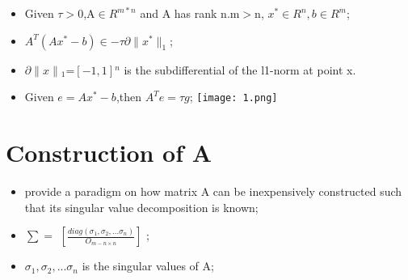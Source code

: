\documentclass{beamer}
\begin{document}
\begin{frame}
	\begin{itemize}
			\item Given $\tau>0$,A$\in R^{m*n}$ and A has rank n.m$>$n, ${x^*}\in{R^n},b \in {R^m}$;
			\item ${A^T} \left( Ax^* -b \right)\in -\tau \partial\|x ^{*}\|_{1}$;
			\item $\partial\|x\|{_1}$=$\left[-1, 1\right]{^n}$  is the subdifferential of the l1-norm at point x.
	\end{itemize}
\end{frame}

\begin{frame}
	\begin{itemize}
			\item Given $e = Ax^* -b$,then $A^T e = \tau g$;
			\texttt{[image: 1.png]} 
	\end{itemize}
\end{frame}

\section{Construction of  A}
\begin{frame}
    \tableofcontents[currentsection]
\end{frame}

\begin{frame}
	\begin{itemize}
			\item provide a paradigm on how matrix A can be inexpensively constructed such that its singular value decomposition is known;
			\item $\sum=$ $\left[ \frac{diag \left( \sigma _{1},\sigma _{2},...\sigma _{n}\right)}{O_{m-n \times n}}\right]$ ;
			\item $\sigma _{1},\sigma _{2},...\sigma _{n}$ is the singular values of A;				
	\end{itemize}
\end{frame}
\end{document}
